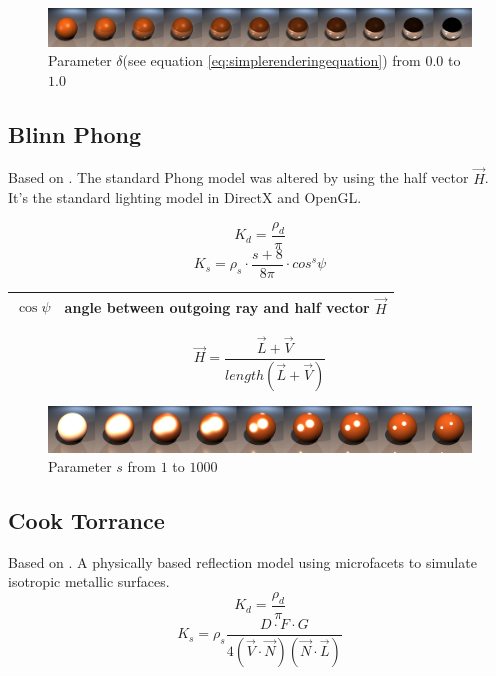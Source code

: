 \documentclass[11pt,a4paper]{article}
\begin{document}
\begin{figure}[H]
\includegraphics[width=\textwidth]{phongreflcomplete.png}
\caption{Parameter $\delta$(see equation \ref{eq:simplerenderingequation}) from $0.0$ to $1.0$}
\end{figure}


\newpage
\subsection{Blinn Phong}
Based on \cite{Bli77}. The standard Phong model was altered by using the half vector $\vec{H}$. It's the standard lighting model in DirectX and OpenGL.

\begin{equation}
K_d = \frac{\rho_d}{\pi}
\end{equation}
\begin{equation}
K_s = \rho_s \cdot \frac{s+8}{8\pi} \cdot cos^s\psi
\end{equation}

\begin{table}[H]
\begin{tabular}{| c | l |}
\hline
$\cos\psi$ & angle between outgoing ray and half vector $\vec{H}$\\ \hline
\end{tabular}
\end{table}
\begin{equation}
\vec{H} = \frac{\vec{L}+\vec{V}}{length(\vec{L}+\vec{V})}
\label{eq:H}
\end{equation}

\begin{figure}[H]
\includegraphics[width=\textwidth]{blinnphongshinecomplete.png}
\caption{Parameter $s$ from $1$ to $1000$}
\end{figure}


\newpage
\subsection{Cook Torrance}
Based on \cite{CT82}. A physically based reflection model using microfacets to simulate isotropic metallic surfaces.
\begin{equation}
K_d = \frac{\rho_d}{\pi}
\end{equation}
\begin{equation}
K_s =\rho_s \frac{D \cdot F \cdot G}{4(\vec{V} \cdot \vec{N})(\vec{N} \cdot \vec{L})}
\end{equation}
\end{document}
